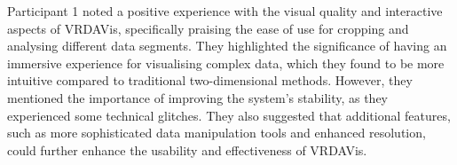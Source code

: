 

Participant 1 noted a positive experience with the visual quality and interactive aspects of VRDAVis, specifically praising the ease of use for cropping and analysing different data segments. 
They highlighted the significance of having an immersive experience for visualising complex data, which they found to be more intuitive compared to traditional two-dimensional methods. 
However, they mentioned the importance of improving the system’s stability, as they experienced some technical glitches. 
They also suggested that additional features, such as more sophisticated data manipulation tools and enhanced resolution, could further enhance the usability and effectiveness of VRDAVis. 






